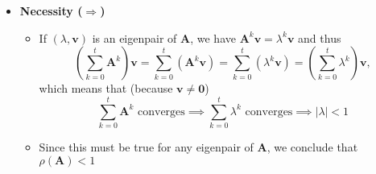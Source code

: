 \documentclass[12pt,a4paper]{article}
\begin{document}
\begin{itemize}
\item \textbf{Necessity ($\Longrightarrow$)}
  \begin{itemize}
  \item If $(\lambda,\bm{v})$ is an eigenpair of $\bm{A}$,
    we have $\bm{A}^{k}\bm{v}=\lambda^{k}\bm{v}$ and thus
    \begin{equation}\nonumber%
      \left(\sum_{k=0}^{t}\bm{A}^{k}\right)\bm{v}
      =
      \sum_{k=0}^{t}\left(\bm{A}^{k}\bm{v}\right)
      =
      \sum_{k=0}^{t}\left(\lambda^{k}\bm{v}\right)
      =
      \left(\sum_{k=0}^{t}\lambda^{k}\right)\bm{v},
    \end{equation}
    which means that (because $\bm{v}\neq \bm{0}$)
    \begin{equation}\nonumber%
      \text{$\sum_{k=0}^{t}\bm{A}^{k}$ converges}
      \implies
      \text{$\sum_{k=0}^{t}\lambda^{k}$ converges}
      \implies
      |\lambda|<1
    \end{equation}
  \item Since this must be true for any eigenpair of $\bm{A}$,
    we conclude that $\rho(\bm{A})<1$
  \end{itemize}


\end{itemize}
\end{document}
